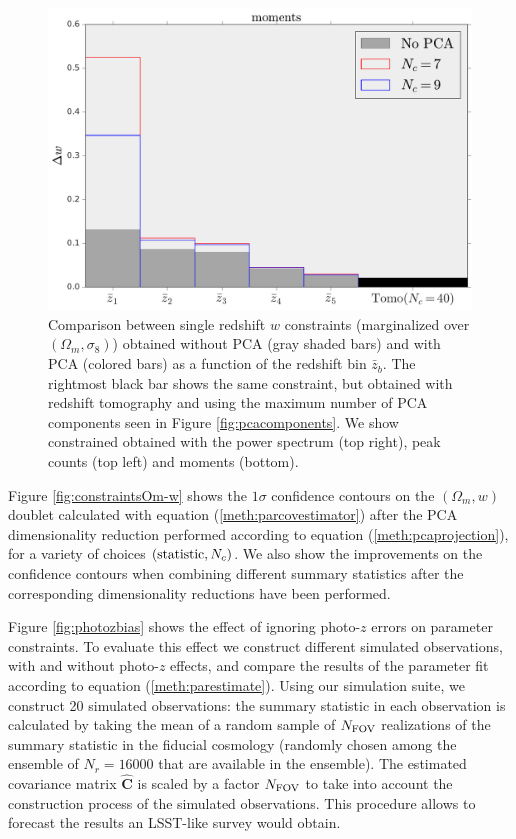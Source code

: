 \documentclass[reprint,aps,prd,superscriptaddress,showkeys,showpacs]{revtex4-1}
\newcommand{\bbh}[1]{\mathbf{\hat{#1}}}
\begin{document}
\begin{figure}
\includegraphics[scale=0.3]{Figures/w_moments_no_pca.pdf}
\caption{Comparison between single redshift $w$ constraints (marginalized over $(\Omega_m,\sigma_8)$) obtained without PCA (gray shaded bars) and with PCA (colored bars) as a function of the redshift bin $\bar{z}_b$. The rightmost black bar shows the same constraint, but obtained with redshift tomography and using the maximum number of PCA components seen in Figure \ref{fig:pcacomponents}. We show constrained obtained with the power spectrum (top right), peak counts (top left) and moments (bottom).}
\label{fig:nopca}
\end{figure}

Figure \ref{fig:constraintsOm-w} shows the $1\sigma$ confidence contours on the $(\Omega_m,w)$ doublet calculated with equation (\ref{meth:parcovestimator}) after the PCA dimensionality reduction performed according to equation (\ref{meth:pcaprojection}), for a variety of choices $({\rm statistic},N_c)$. We also show the improvements on the confidence contours when combining different summary statistics after the corresponding dimensionality reductions have been performed. 

Figure \ref{fig:photozbias} shows the effect of ignoring photo-$z$ errors on parameter constraints. To evaluate this effect we construct different simulated observations, with and without photo-$z$ effects, and compare the results of the parameter fit according to equation (\ref{meth:parestimate}). Using our simulation suite, we construct 20 simulated observations: the summary statistic in each observation is calculated by taking the mean of a random sample of $N_{\rm FOV}$ realizations of the summary statistic in the fiducial cosmology (randomly chosen among the ensemble of $N_r=16000$ that are available in the ensemble). The estimated covariance matrix $\bbh{C}$ is scaled by a factor $N_{\rm FOV}$ to take into account the construction process of the simulated observations. This procedure allows to forecast the results an LSST-like survey would obtain.        
\end{document}
